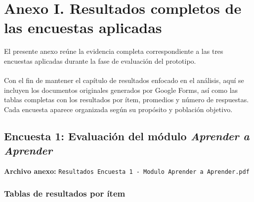 \section*{Anexo I. Resultados completos de las encuestas aplicadas}
\label{anexo:encuestas}

El presente anexo reúne la evidencia completa correspondiente a las tres encuestas aplicadas durante la fase de evaluación del prototipo.
\\
\\
Con el fin de mantener el capítulo de resultados enfocado en el análisis, aquí se incluyen los documentos originales generados por Google Forms, así como las tablas completas con los resultados por ítem, promedios y número de respuestas. Cada encuesta aparece organizada según su propósito y población objetivo.

\vspace{0.4cm}

\subsection*{Encuesta 1: Evaluación del módulo \textit{Aprender a Aprender}}

\vspace{0.2cm}
\noindent\textbf{Archivo anexo:}  
\texttt{Resultados Encuesta 1 - Modulo Aprender a Aprender.pdf}

\vspace{0.5cm}

\subsubsection*{Tablas de resultados por ítem}

